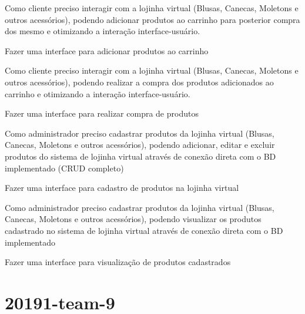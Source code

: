 Como cliente preciso interagir com a lojinha virtual (Blusas, Canecas, Moletons e outros acessórios), podendo adicionar produtos ao carrinho para posterior compra dos mesmo e otimizando a interação interface-\/usuário.
\begin{DoxyItemize}
\item Fazer uma interface para adicionar produtos ao carrinho
\end{DoxyItemize}

Como cliente preciso interagir com a lojinha virtual (Blusas, Canecas, Moletons e outros acessórios), podendo realizar a compra dos produtos adicionados ao carrinho e otimizando a interação interface-\/usuário.
\begin{DoxyItemize}
\item Fazer uma interface para realizar compra de produtos
\end{DoxyItemize}

Como administrador preciso cadastrar produtos da lojinha virtual (Blusas, Canecas, Moletons e outros acessórios), podendo adicionar, editar e excluir produtos do sistema de lojinha virtual através de conexão direta com o BD implementado (C\+R\+UD completo)
\begin{DoxyItemize}
\item Fazer uma interface para cadastro de produtos na lojinha virtual
\end{DoxyItemize}

Como administrador preciso cadastrar produtos da lojinha virtual (Blusas, Canecas, Moletons e outros acessórios), podendo visualizar os produtos cadastrado no sistema de lojinha virtual através de conexão direta com o BD implementado
\begin{DoxyItemize}
\item Fazer uma interface para visualização de produtos cadastrados
\end{DoxyItemize}

\section*{20191-\/team-\/9}
